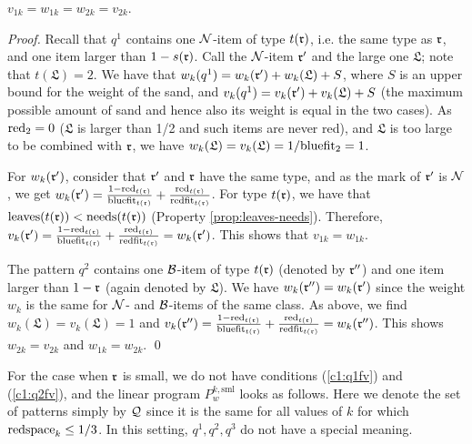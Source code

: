 \begin{lemma}
	\label{lem:10}
	$v_{1k}=w_{1k} = w_{2k}=v_{2k}$.
\end{lemma}
\begin{proof}
	Recall that $q^1$ contains one $\mathcal{N}$-item of type $t(\mathfrak{r})$, i.e. the same type as $\mathfrak{r}$, and one item larger than $1-s(\mathfrak{r})$. Call the $\mathcal{N}$-item $\mathfrak{r}'$ and the large one $\mathfrak{L}$; note that $t(\mathfrak{L})=2$. We have that $w_k(q^1) = w_k(\mathfrak{r}') + w_k(\mathfrak{L}) + S$, where $S$ is an upper bound for the weight of the sand, and $v_k(q^1) = v_k(\mathfrak{r}') + v_k(\mathfrak{L}) + S$ (the maximum possible amount of sand and hence also its weight is equal in the two cases). As  $\mathrm{red}_2 = 0$ ($\mathfrak{L}$ is larger than 1/2 and such items are never red), and $\mathfrak{L}$ is too large to be combined with $\mathfrak{r}$, 
	we have $w_k(\mathfrak{L}) = v_k(\mathfrak{L}) = 1/\mathrm{bluefit}_2=1$. 
	
	For $w_k(\mathfrak{r}')$, consider that $\mathfrak{r}'$ and $\mathfrak{r}$ have the same type, and as the mark of $\mathfrak{r}'$ is $\mathcal{N}$, we get $w_k(\mathfrak{r}') = \frac{1-\mathrm{red}_{t(\mathfrak{r})}}{\mathrm{bluefit}_{t(\mathfrak{r})}} + \frac{\mathrm{red}_{t(\mathfrak{r})}}{\mathrm{redfit}_{t(\mathfrak{r})}}$.
	For type $t(\mathfrak{r})$, we have that $\mathrm{leaves}(t(\mathfrak{r}))<\mathrm{needs}(t(\mathfrak{r}))$ (Property \ref{prop:leaves-needs}). Therefore, $v_k(\mathfrak{r}') = \frac{1-\mathrm{red}_{t(\mathfrak{r})}}{\mathrm{bluefit}_{t(\mathfrak{r})}} + \frac{\mathrm{red}_{t(\mathfrak{r})}}{\mathrm{redfit}_{t(\mathfrak{r})}} = w_k(\mathfrak{r}')$.
	This shows that $v_{1k}=w_{1k}$.
	
	The pattern $q^2$ contains one $\mathcal{B}$-item of type $t(\mathfrak{r})$ (denoted by $\mathfrak{r}''$) and one item larger than $1-\mathfrak{r}$ (again denoted by $\mathfrak{L}$). 
	We have $w_k(\mathfrak{r}'') = w_k(\mathfrak{r}')$ since the weight $w_k$ is the same for $\mathcal{N}$- and $\mathcal{B}$-items of the same class. As above, we find  $w_k(\mathfrak{L})
	=v_k(\mathfrak{L})=1$ and 
	$v_k(\mathfrak{r}'') = \frac{1-\mathrm{red}_{t(\mathfrak{r})}}{\mathrm{bluefit}_{t(\mathfrak{r})}} + \frac{\mathrm{red}_{t(\mathfrak{r})}}{\mathrm{redfit}_{t(\mathfrak{r})}} = w_k(\mathfrak{r}'')$.
	This shows $w_{2k}=v_{2k}$ and $w_{1k}=w_{2k}$.
	\qed\end{proof}

For the case {when $\mathfrak{r}$ is small}, we do not have conditions
(\ref{c1:q1fv}) and (\ref{c1:q2fv}), and
the linear program $P_w^{k,\text{sml}}$ looks as follows.
Here we denote the set of patterns simply by $\mathcal{Q}$ since it is the same for all values of $k$
for which $\mathrm{redspace}_k\le1/3$. In this setting, $q^1,q^2,q^3$ do not have a special meaning.

